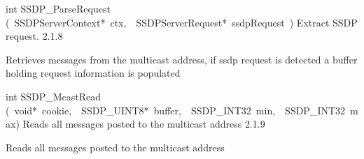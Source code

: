 \documentclass{article}
\begin{document}
\begin{cxxentry}
\begin{cxxentry}
\begin{cxxfunction}
\begin{cxxdoc}
\end{cxxdoc}
\end{cxxfunction}
\begin{cxxfunction}
{int}
        {SSDP\_ParseRequest}
        {(\ SSDPServerContext*\ ctx,\ \ SSDPServerRequest*\ ssdpRequest\ )}
        {Extract SSDP request. }
        {2.1.8}
\begin{cxxdoc}
Retrieves messages from the multicast address, if ssdp request is
detected a buffer holding request information is populated


\end{cxxdoc}
\end{cxxfunction}
\begin{cxxfunction}
{int}
        {SSDP\_McastRead}
        {(\ void*\ cookie,\ \ SSDP\_UINT8*\ buffer,\ \ SSDP\_INT32\ min,\ \ SSDP\_INT32\ max)}
        {Reads all messages posted to the multicast address}
        {2.1.9}
\begin{cxxdoc}
Reads all messages posted to the multicast address



\end{cxxdoc}
\end{cxxfunction}
\end{cxxentry}
\end{cxxentry}
\end{document}
